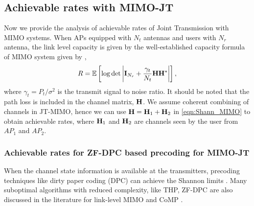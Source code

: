 \subsection{Achievable rates with MIMO-JT}
\label{subsec:MIMO-JT_rates}
Now we provide the analysis of achievable rates of Joint Transmission with MIMO systems. When APs equipped with $N_t$ antennas and users with $N_r$ antenna, the link level capacity is given by the well-established capacity formula of MIMO system given by \cite{Telatar_MIMO_cap,TseViswa_Funda}, 
\begin{align}\label{eqn:Shann_MIMO}
R = \operatorname{\mathbb{E}} \left[ \log \det \left| \mathbf{I}_{N_r} + \frac{\gamma_t}{N_t} \mathbf{H} \mathbf{H}^* \right|\right], 
\end{align}
where $\gamma_t=P_t/\sigma^2$ is the transmit signal to noise ratio. It should be noted that the path loss is included in the channel matrix, $\mathbf{H}$. We assume coherent combining of channels in JT-MIMO, hence we can use $\mathbf{H} = \mathbf{H}_1 + \mathbf{H}_2$ in \eqref{eqn:Shann_MIMO} to obtain achievable rates, where $\mathbf{H}_1$ and $\mathbf{H}_2$ are channels seen by the user from $AP_1$ and $AP_2$.


\subsubsection{Achievable rates for ZF-DPC based precoding for MIMO-JT}
When the channel state information is available at the transmitters, precoding techniques like dirty paper coding (DPC) can achieve the Shannon limits \cite{Costa_DPC}. Many suboptimal  algorithms with reduced complexity, like THP, ZF-DPC are also discussed in the literature for link-level MIMO and CoMP \cite{Erex_DPC, SpencerZFMU, HarashimaMiyakawa, Tomlinson}.  


